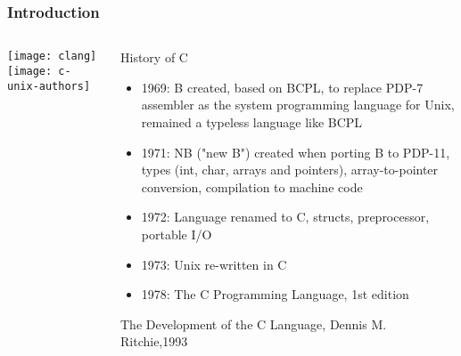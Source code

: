 \begin{frame}[plain]
	\frametitle{Introduction}
	
	
	
	\begin{columns}
		
		\begin{column}{.3\textwidth}
			
			\texttt{[image: clang]}
			\texttt{[image: c-unix-authors]}
		\end{column}
		
		\begin{column}{.7\textwidth}
			
			\Large
			History of C
			\normalsize
			\begin{itemize}
				\item  1969: B created, based on BCPL, to replace PDP-7 assembler as the system programming language for Unix, remained a typeless language like BCPL 
			
				
				\item 1971: NB ("new B") created when porting B to PDP-11, types (int, char, arrays and pointers), array-to-pointer conversion, compilation to machine code 
				\item 1972: Language renamed to C, structs, preprocessor, portable I/O
				\item 1973: Unix re-written in C 
				\item 1978: The C Programming Language, 1st edition 
			\end{itemize}
			
			\tiny The Development of the C Language, Dennis M. Ritchie,1993
		\end{column}
		
		
	\end{columns}
	
	
\end{frame}


